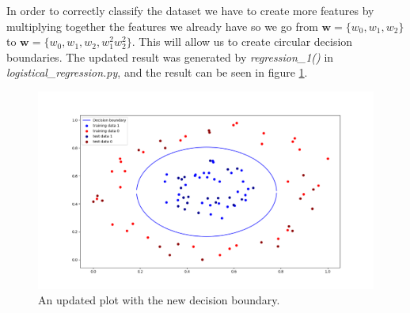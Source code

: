 \documentclass[a4paper]{article}
\begin{document}
\begin{enumerate}
            In order to correctly classify the dataset we have to create more
            features by multiplying together the features we already have so
            we go from $\textbf{w} = \{w_0, w_1, w_2\}$ to $\textbf{w} = \{w_0,
            w_1, w_2, w_1^2 w_2^2\}$.  This will allow us to create circular
            decision boundaries. The updated result was generated by
            \emph{regression\_1()} in \emph{logistical\_regression.py}, and the
            result can be seen in figure \ref{fig:dataset2-corrected}.

            \begin{figure}[h]
                \includegraphics[width=\linewidth]{dataset2_corrected.png}
                \caption{An updated plot with the new decision boundary.}
                \label{fig:dataset2-corrected}
            \end{figure}

    \end{enumerate}
\end{document}
